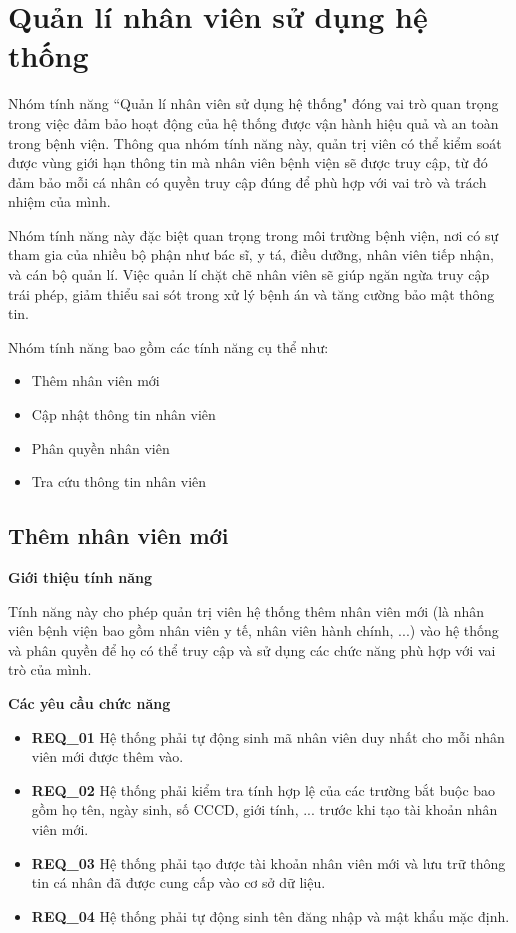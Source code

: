 \section{Quản lí nhân viên sử dụng hệ thống}

Nhóm tính năng ``Quản lí nhân viên sử dụng hệ thống" đóng vai trò quan trọng trong việc đảm bảo hoạt động của hệ thống được vận hành hiệu quả và an toàn trong bệnh viện. Thông qua nhóm tính năng này, quản trị viên có thể kiểm soát được vùng giới hạn thông tin mà nhân viên bệnh viện sẽ được truy cập, từ đó đảm bảo mỗi cá nhân có quyền truy cập đúng để phù hợp với vai trò và trách nhiệm của mình.

Nhóm tính năng này đặc biệt quan trọng trong môi trường bệnh viện, nơi có sự tham gia của nhiều bộ phận như bác sĩ, y tá, điều dưỡng, nhân viên tiếp nhận, và cán bộ quản lí. Việc quản lí chặt chẽ nhân viên sẽ giúp ngăn ngừa truy cập trái phép, giảm thiểu sai sót trong xử lý bệnh án và tăng cường bảo mật thông tin.

Nhóm tính năng bao gồm các tính năng cụ thể như:

\begin{itemize}
  \item Thêm nhân viên mới
  \item Cập nhật thông tin nhân viên
  \item Phân quyền nhân viên
  \item Tra cứu thông tin nhân viên
\end{itemize}

\subsection{Thêm nhân viên mới}

\noindent \textbf{Giới thiệu tính năng}

Tính năng này cho phép quản trị viên hệ thống thêm nhân viên mới (là nhân viên bệnh viện bao gồm nhân viên y tế, nhân viên hành chính, ...) vào hệ thống và phân quyền để họ có thể truy cập và sử dụng các chức năng phù hợp với vai trò của mình.

\noindent \textbf{Các yêu cầu chức năng}

\begin{itemize}
  \item \textbf{REQ\_01} Hệ thống phải tự động sinh mã nhân viên duy nhất cho mỗi nhân viên mới được thêm vào.
  \item \textbf{REQ\_02} Hệ thống phải kiểm tra tính hợp lệ của các trường bắt buộc bao gồm họ tên, ngày sinh, số CCCD, giới tính, ... trước khi tạo tài khoản nhân viên mới.
  \item \textbf{REQ\_03} Hệ thống phải tạo được tài khoản nhân viên mới và lưu trữ thông tin cá nhân đã được cung cấp vào cơ sở dữ liệu.
  \item \textbf{REQ\_04} Hệ thống phải tự động sinh tên đăng nhập và mật khẩu mặc định.
\end{itemize}

